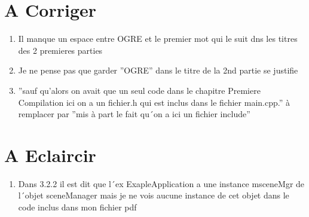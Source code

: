 \documentclass[10pt,a4paper]{report}
\begin{document}
\part{A Corriger}
\begin{enumerate}
\item Il manque un espace entre OGRE et le premier mot qui le suit dns les titres des 2 premieres parties

\item Je ne pense pas que garder ''OGRE'' dans le titre de la 2nd partie se justifie




\item ''sauf qu'alors on avait que un seul code dans le chapitre Premiere Compilation ici on a un fichier.h qui est inclus dans le fichier main.cpp.'' \`a remplacer par ''mis \`a part le fait qu´on a ici un fichier include''





\end{enumerate}



\part{A Eclaircir}
\begin{enumerate}
\item Dans 3.2.2 il est dit que l´ex ExapleApplication a une instance msceneMgr de l´objet sceneManager mais je ne vois aucune instance de cet objet dans le code inclus dans mon fichier pdf
\end{enumerate}
\end{document}
